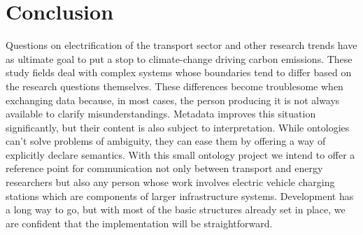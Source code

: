﻿\section{Conclusion}
\label{conclusion}

Questions on electrification of the transport sector and other research trends
have as ultimate goal to put a stop to climate-change driving carbon emissions.
These study fields deal with complex systems whose boundaries tend to differ
based on the research questions themselves. These differences become
troublesome when exchanging data because, in most cases, the person producing
it is not always available to clarify misunderstandings. Metadata improves this
situation significantly, but their content is also subject to interpretation.
While ontologies can't solve problems of ambiguity, they can ease them by
offering a way of explicitly declare semantics. With this small ontology
project we intend to offer a reference point for communication not only between
transport and energy researchers but also any person whose work involves
electric vehicle charging stations which are components of larger
infrastructure systems. Development has a long way to go, but with most of the
basic structures already set in place, we are confident that the implementation
will be straightforward.